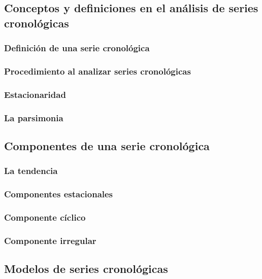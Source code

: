 \documentclass[
]{article}
\begin{document}
\subsection{Conceptos y definiciones en el análisis de series cronológicas}

\subsubsection{Definición de una serie cronológica}

\subsubsection{Procedimiento al analizar series cronológicas}

\subsubsection{Estacionaridad}

\subsubsection{La parsimonia}

\subsection{Componentes de una serie cronológica}

\subsubsection{La tendencia}

\subsubsection{Componentes estacionales}

\subsubsection{Componente cíclico}

\subsubsection{Componente irregular}

\subsection{Modelos de series cronológicas}
\end{document}
